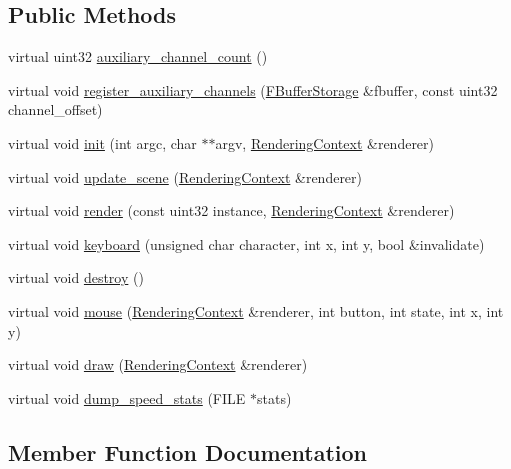 \subsection*{Public Methods}
\begin{DoxyCompactItemize}
\item 
virtual uint32 \hyperlink{struct_renderer_interface_a0bedb16a0103c95dae460afef2a0fc2a}{auxiliary\+\_\+channel\+\_\+count} ()
\item 
virtual void \hyperlink{struct_renderer_interface_aca2dd8b8b27e3e6f7fcf81c0d8d17ce5}{register\+\_\+auxiliary\+\_\+channels} (\hyperlink{struct_f_buffer_storage}{F\+Buffer\+Storage} \&fbuffer, const uint32 channel\+\_\+offset)
\item 
virtual void \hyperlink{struct_renderer_interface_a2ead9b943d6d48fcd32872e0005ebe63}{init} (int argc, char $\ast$$\ast$argv, \hyperlink{struct_rendering_context}{Rendering\+Context} \&renderer)
\item 
virtual void \hyperlink{struct_renderer_interface_a754143d3228c27eab32f1760217afe56}{update\+\_\+scene} (\hyperlink{struct_rendering_context}{Rendering\+Context} \&renderer)
\item 
virtual void \hyperlink{struct_renderer_interface_aa64254dd44c94929b05092dc8d74f29d}{render} (const uint32 instance, \hyperlink{struct_rendering_context}{Rendering\+Context} \&renderer)
\item 
virtual void \hyperlink{struct_renderer_interface_a9f5afd3701d8d935a2ecf08fb9f5f604}{keyboard} (unsigned char character, int x, int y, bool \&invalidate)
\item 
virtual void \hyperlink{struct_renderer_interface_a7469218aafa029a3e22bac2c00dca9f5}{destroy} ()
\item 
virtual void \hyperlink{struct_renderer_interface_aae7f55e0f8863e6a2ed3205d228ab306}{mouse} (\hyperlink{struct_rendering_context}{Rendering\+Context} \&renderer, int button, int state, int x, int y)
\item 
virtual void \hyperlink{struct_renderer_interface_a44e91217896e95a3fd46b26eef51a6da}{draw} (\hyperlink{struct_rendering_context}{Rendering\+Context} \&renderer)
\item 
virtual void \hyperlink{struct_renderer_interface_a378df3aa18095da5ce8011fb25c8fb8e}{dump\+\_\+speed\+\_\+stats} (F\+I\+LE $\ast$stats)
\end{DoxyCompactItemize}


\subsection{Member Function Documentation}
\mbox{\label{struct_renderer_interface_a0bedb16a0103c95dae460afef2a0fc2a}} 
